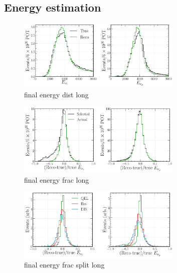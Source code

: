 \subsection{Energy estimation} %
\label{sec:cvn_results_energy} %

\begin{figure} %
    \includegraphics[width=0.7\textwidth]{diagrams/6-cvn/chipsnet/final_energy_dists.pdf}
    \caption[final energy dists short]
    {final energy dist long}
    \label{fig:final_energy_dists}
\end{figure}

\begin{figure} %
    \includegraphics[width=0.7\textwidth]{diagrams/6-cvn/chipsnet/final_energy_frac.pdf}
    \caption[final energy frac short]
    {final energy frac long}
    \label{fig:final_energy_frac}
\end{figure}

\begin{figure} %
    \includegraphics[width=0.7\textwidth]{diagrams/6-cvn/chipsnet/final_energy_frac_split.pdf}
    \caption[final energy frac split short]
    {final energy frac split long}
    \label{fig:final_energy_frac_split}
\end{figure}

